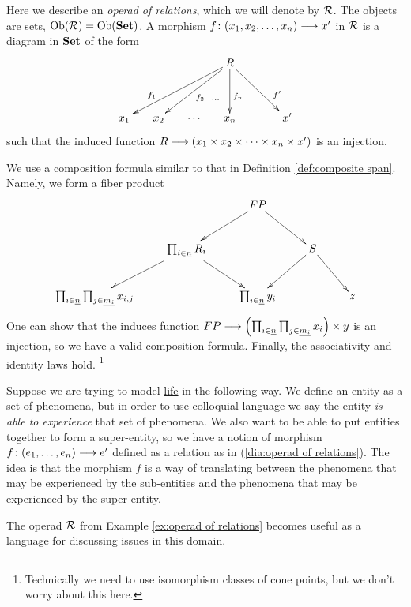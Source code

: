 \documentclass[CT4S-EN-RU]{subfiles}
\begin{document}

\subsubsection{}


\begin{example}\label{ex:operad of relations}

Here we describe an {\em operad of relations}, which we will denote by $\mathcal{R}$. The objects are sets, $\textnormal{Ob}(\mathcal{R})=\textnormal{Ob}({\bf Set})$. A morphism $f\colon (x_1,x_2,\ldots,x_n)\longrightarrow x'$ in $\mathcal{R}$ is a diagram in ${\bf Set}$ of the form 
\begin{align}\label{dia:operad of relations}
\xymatrix@=15pt{&&&R\ar[llldd]_(.7){f_1}\ar[lldd]^{f_2}\ar@{}[ldd]^(.6)\cdots\ar[dd]^(.6){f_n}\ar[rrdd]^(.7){f'}\\\\x_1&x_2&\cdots&x_n&&x'}
\end{align} 
such that the induced function $R\longrightarrow(x_1\times x_2\times\cdots\times x_n\times x')$ is an injection.

We use a composition formula similar to that in Definition \ref{def:composite span}. Namely, we form a fiber product
$$\xymatrix{&&FP\ar[rd]\ar[ld]\\&\prod_{i\in\ul{n}}R_i\ar[ld]\ar[rd]&&S\ar[ld]\ar[rd]\\\prod_{i\in\ul{n}}\prod_{j\in\ul{m_i}}x_{i,j}&&\prod_{i\in\ul{n}}y_i&&z}$$
One can show that the induces function $FP\longrightarrow\left(\prod_{i\in\underline{n}}\prod_{j\in\underline{m_i}}x_i\right)\times y$ is an injection, so we have a valid composition formula. Finally, the associativity and identity laws hold.
\footnote{Technically we need to use isomorphism classes of cone points, but we don't worry about this here.}

\end{example}

\begin{application}\label{app:entity by experience}
Suppose we are trying to model \href{http://en.wikipedia.org/wiki/Life}{\text life} in the following way. We define an entity as a set of phenomena, but in order to use colloquial language we say the entity {\em is able to experience} that set of phenomena. We also want to be able to put entities together to form a super-entity, so we have a notion of morphism $f\colon(e_1,\ldots,e_n)\longrightarrow e'$ defined as a relation as in (\ref{dia:operad of relations}). The idea is that the morphism $f$ is a way of translating between the phenomena that may be experienced by the sub-entities and the phenomena that may be experienced by the super-entity. 

The operad $\mathcal{R}$ from Example \ref{ex:operad of relations} becomes useful as a language for discussing issues in this domain.
\end{application}
\end{document}
